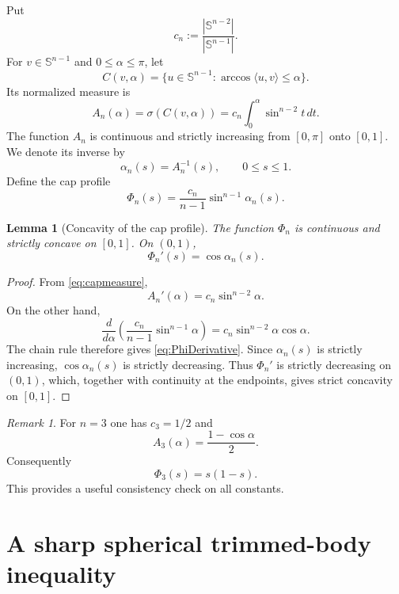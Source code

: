 \documentclass[11pt,reqno]{amsart}
\newtheorem{lemma}[theorem]{Lemma}
\theoremstyle{remark}
\newtheorem{remark}[theorem]{Remark}
\begin{document}
Put
\begin{equation}\label{eq:cn}
 c_n:=\frac{|\mathbb S^{n-2}|}{|\mathbb S^{n-1}|}.
\end{equation}
For $v\in\mathbb S^{n-1}$ and $0\le\alpha\le\pi$, let
\[
 C(v,\alpha)=
 \{u\in\mathbb S^{n-1}:\arccos\langle u,v\rangle\le\alpha\}.
\]
Its normalized measure is
\begin{equation}\label{eq:capmeasure}
 A_n(\alpha)
 =\sigma(C(v,\alpha))
 =c_n\int_0^\alpha \sin^{n-2}t\,dt.
\end{equation}
The function $A_n$ is continuous and strictly increasing from $[0,\pi]$
onto $[0,1]$.  We denote its inverse by
\[
 \alpha_n(s)=A_n^{-1}(s),\qquad 0\le s\le1.
\]
Define the cap profile
\begin{equation}\label{eq:Phi}
 \Phi_n(s)
 =
 \frac{c_n}{n-1}\sin^{n-1}\alpha_n(s).
\end{equation}

\begin{lemma}[Concavity of the cap profile]\label{lem:concavity}
The function $\Phi_n$ is continuous and strictly concave on $[0,1]$.  On $(0,1)$,
\begin{equation}\label{eq:PhiDerivative}
 \Phi_n'(s)=\cos\alpha_n(s).
\end{equation}
\end{lemma}

\begin{proof}
From \eqref{eq:capmeasure},
\[
 A_n'(\alpha)=c_n\sin^{n-2}\alpha.
\]
On the other hand,
\[
 \frac{d}{d\alpha}
 \left(
 \frac{c_n}{n-1}\sin^{n-1}\alpha
 \right)
 =
 c_n\sin^{n-2}\alpha\cos\alpha.
\]
The chain rule therefore gives \eqref{eq:PhiDerivative}.  Since
$\alpha_n(s)$ is strictly increasing, $\cos\alpha_n(s)$ is strictly
decreasing.  Thus $\Phi_n'$ is strictly decreasing on $(0,1)$, which,
together with continuity at the endpoints, gives strict concavity on $[0,1]$.
\end{proof}

\begin{remark}\label{rem:n3}
For $n=3$ one has $c_3=1/2$ and
\[
 A_3(\alpha)=\frac{1-\cos\alpha}{2}.
\]
Consequently
\[
 \Phi_3(s)=s(1-s).
\]
This provides a useful consistency check on all constants.
\end{remark}

\section{A sharp spherical trimmed-body inequality}
\end{document}
